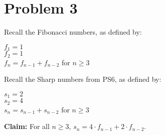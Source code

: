 \documentclass{article}
\begin{document}
\pagebreak

\section{Problem 3}

Recall the Fibonacci numbers, as defined by:
\begin{center}
    \begin{minipage}{0.5\textwidth} %
        \raggedright %
        $f_1=1$ \\
        $f_2=1$ \\
        $f_n=f_{n-1}+f_{n-2}$ for $n\geq 3$
    \end{minipage}
\end{center}
\vspace{10pt}

Recall the Sharp numbers from PS6, as defined by:
\begin{center}
    \begin{minipage}{0.5\textwidth} %
        \raggedright %
		$s_1=2$ \\
		$s_2=4$ \\
		$s_n=s_{n-1}+s_{n-2}$ for $n\geq 3$
    \end{minipage}
\end{center}
\vspace{10pt}

\textbf{Claim:} For all $n\geq 3$, $s_n=4\cdot f_{n-1}+2\cdot f_{n-2}$.

\vspace{10pt}
\end{document}
